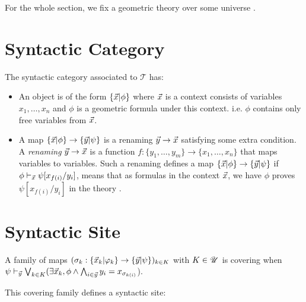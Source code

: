 For the whole section, we fix a geometric theory \thT{} over some universe \Univ{}.

\section{Syntactic Category}
\begin{definition}
  
  \leanok
  The syntactic category associated to $\mathcal{T}$ has:
  \begin{itemize}
    \item An object is of the form $\{ \vec{x} | \phi \}$ where $\vec{x}$ is a context consists of variables $x_1, \ldots, x_{n}$ and $\phi $ is a geometric
    formula under this context. i.e. $\phi$ contains only free variables from $\vec{x}$.
    \item A map $\{ \vec{x} | \phi \}\to \{ \vec{y} | \psi \}$ is a renaming $\vec{y}\to \vec{x}$ satisfying some extra condition.
    A \emph{renaming} $\vec{y}\to \vec{x}$ is a function $f:\{y_1,\ldots,y_m\}\to \{x_1,\ldots,x_n\}$ that maps variables to variables.
    Such a renaming defines a map $\{ \vec{x} | \phi \}\to \{ \vec{y} | \psi \}$ if $\phi\vdash_{\vec{x}}\psi[x_{f(i)}/y_i]$, means that as formulas in the context $\vec{x}$, we have $\phi$
    proves $\psi[x_{f(i)}/y_i]$ in the theory  \thT{}.
  \end{itemize}
\end{definition}



\section{Syntactic Site}
\begin{definition}
  \label{Def:CoveringFamily}
  \leanok
  A family of maps $(\sigma_k : \{ \vec{x}_k | \varphi_k \}\to \{ \vec{y} | \psi \})_{k \in K}$ with $K \in \mathscr{U}$ is covering when
  $\psi \vdash_{\vec{y}} \bigvee_{k \in K} (\exists \vec{x}_k, \phi \wedge \bigwedge_{i \in \vec{y}} y_i = x_{\sigma_{k(i)}}$).
\end{definition}

This covering family defines a syntactic site:

